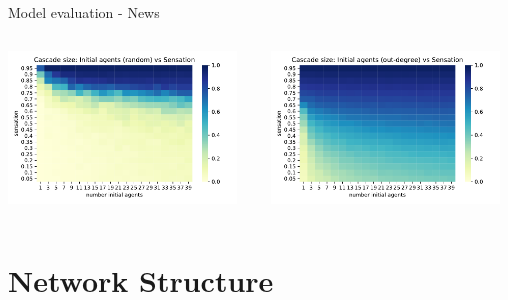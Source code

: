 \documentclass{beamer}
\begin{document}
\begin{frame}{Model evaluation - News}
    \begin{columns}
        \begin{column}{0.5\textwidth}
            \centering
            \includegraphics[width=0.95\textwidth]{images/initial_sensation_random.pdf}
        \end{column}
        \begin{column}{0.5\textwidth}
            \centering
            \includegraphics[width=0.95\textwidth]{images/initial_sensation_out_degree.pdf}
        \end{column}
    \end{columns}
\end{frame}

\section{Network Structure}
\end{document}
